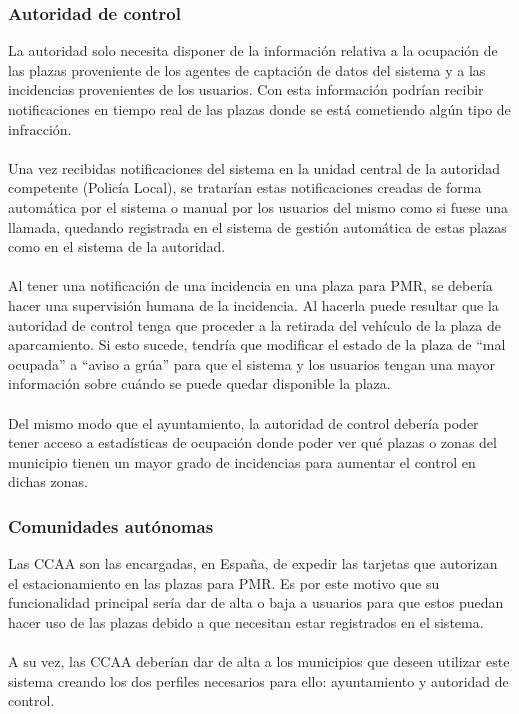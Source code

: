 \subsubsection{Autoridad de control}
La autoridad solo necesita disponer de la información relativa a la ocupación de las plazas proveniente de los agentes de captación de datos del sistema y a las incidencias provenientes de los usuarios. Con esta información podrían recibir notificaciones en tiempo real de las plazas donde se está cometiendo algún tipo de infracción. 
\\\\
Una vez recibidas notificaciones del sistema en la unidad central de la autoridad competente (Policía Local), se tratarían estas notificaciones creadas de forma automática por el sistema o manual por los usuarios del mismo como si fuese una llamada, quedando registrada en el sistema de gestión automática de estas plazas como en el sistema de la autoridad.
\\\\
Al tener una notificación de una incidencia en una plaza para PMR, se debería hacer una supervisión humana de la incidencia. Al hacerla puede resultar que la autoridad de control tenga que proceder a la retirada del vehículo de la plaza de aparcamiento. Si esto sucede, tendría que modificar el estado de la plaza de ``mal ocupada'' a ``aviso a grúa'' para que el sistema y los usuarios tengan una mayor información sobre cuándo se puede quedar disponible la plaza.
\\\\
Del mismo modo que el ayuntamiento, la autoridad de control debería poder tener acceso a estadísticas de ocupación donde poder ver qué plazas o zonas del municipio tienen un mayor grado de incidencias para aumentar el control en dichas zonas.
\subsubsection{Comunidades autónomas}
Las CCAA son las encargadas, en España, de expedir las tarjetas que autorizan el estacionamiento en las plazas para PMR. Es por este motivo que su funcionalidad principal sería dar de alta o baja a usuarios para que estos puedan hacer uso de las plazas debido a que necesitan estar registrados en el sistema.
\\\\
A su vez, las CCAA deberían dar de alta a los municipios que deseen utilizar este sistema creando los dos perfiles necesarios para ello: ayuntamiento y autoridad de control.
